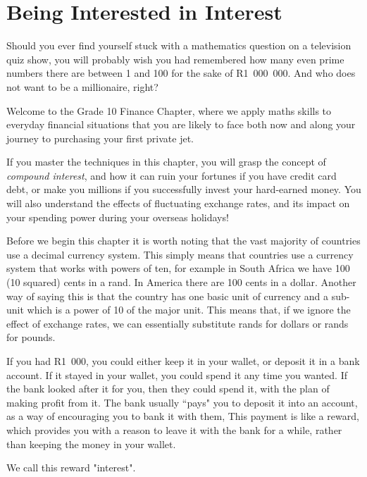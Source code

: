             \section{ Being Interested in Interest}
            \nopagebreak
      \label{m39332*id66349}Should you ever find yourself stuck with a mathematics question on a television quiz show, you will probably wish you had remembered how many even prime numbers there are between 1 and 100 for the sake of R1~000~000. And who does not want to be a millionaire, right?\par 
      \label{m39332*id66356}Welcome to the Grade 10 Finance Chapter, where we apply maths skills to everyday financial situations that you are likely to face both now and along your journey to purchasing your first private jet.\par 
      \label{m39332*id66361}If you master the techniques in this chapter, you will grasp the concept of \textsl{compound interest}, and how it can ruin your fortunes if you have credit card debt, or make you millions if you successfully invest your hard-earned money. You will also understand the effects of fluctuating exchange rates, and its impact on your spending power during your overseas holidays!\par \label{m39332*eip-810}Before we begin this chapter it is worth noting that the vast majority of countries use a decimal currency system. This simply means that countries use a currency system that works with powers of ten, for example in South Africa we have 100 (10 squared) cents in a rand. In America there are 100 cents in a dollar. Another way of saying this is that the country has one basic unit of currency and a sub-unit which is a power of 10 of the major unit. This means that, if we ignore the effect of exchange rates, we can essentially substitute rands for dollars or rands for pounds.\par 
      \label{m39332*id69176}If you had R1~000, you could either keep it in your wallet, or deposit it in a bank account. If it stayed in your wallet, you could spend it any time you wanted. If the bank looked after it for you, then they could spend it, with the plan of making profit from it. The bank usually ``pays" you to deposit it into an account, as a way of encouraging you to bank it with them, This payment is like a reward, which provides you with a reason to leave it with the bank for a while, rather than keeping the money in your wallet.\par 
      \label{m39332*id69184}We call this reward "interest".\par 
